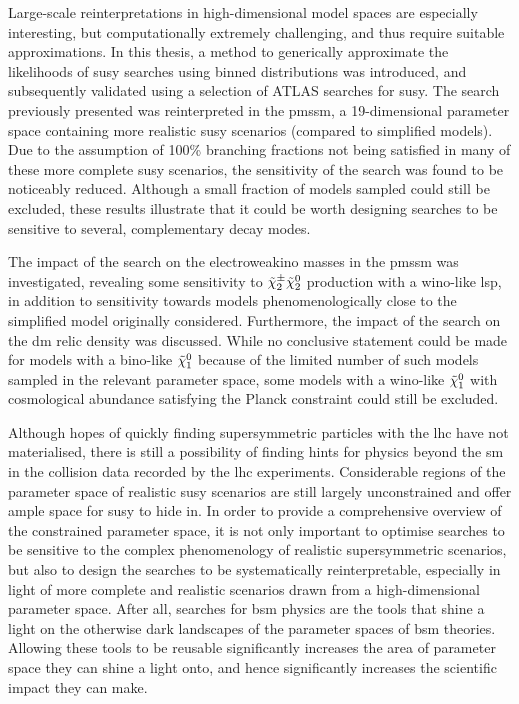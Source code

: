 Large-scale reinterpretations in high-dimensional model spaces are especially interesting, but computationally extremely challenging, and thus require suitable approximations. In this thesis, a method to generically approximate the likelihoods of \gls{susy} searches using binned distributions was introduced, and subsequently validated using a selection of ATLAS searches for \gls{susy}.
The search previously presented was reinterpreted in the \gls{pmssm}, a 19-dimensional parameter space containing more realistic \gls{susy} scenarios (compared to simplified models). Due to the assumption of 100\% branching fractions not being satisfied in many of these more complete \gls{susy} scenarios, the sensitivity of the \onelepton search was found to be noticeably reduced. Although a small fraction of models sampled could still be excluded, these results illustrate that it could be worth designing searches to be sensitive to several, complementary decay modes.

The impact of the \onelepton search on the electroweakino masses in the \gls{pmssm} was investigated, revealing some sensitivity to $\tilde{\chi}_2^\pm\tilde{\chi}_2^0$ production with a wino-like \gls{lsp}, in addition to sensitivity towards models phenomenologically close to the simplified model originally considered. Furthermore, the impact of the \onelepton search on the \gls{dm} relic density was discussed.
While no conclusive statement could be made for models with a bino-like $\tilde{\chi}_1^0$ because of the limited number of such models sampled in the relevant parameter space, some models with a wino-like $\tilde{\chi}_1^0$ with cosmological abundance satisfying the Planck constraint could still be excluded. 
 
 Although hopes of quickly finding supersymmetric particles with the \gls{lhc} have not materialised, there is still a possibility of finding hints for physics beyond the \gls{sm} in the collision data recorded by the \gls{lhc} experiments.
 Considerable regions of the parameter space of realistic \gls{susy} scenarios are still largely unconstrained and offer ample space for \gls{susy} to hide in.
 In order to provide a comprehensive overview of the constrained parameter space, it is not only important to optimise searches to be sensitive to the complex phenomenology of realistic supersymmetric scenarios, but also to design the searches to be systematically reinterpretable, especially in light of more complete and realistic scenarios drawn from a high-dimensional parameter space.
 After all, searches for \gls{bsm} physics are the tools that shine a light on the otherwise dark landscapes of the parameter spaces of \gls{bsm} theories.
 Allowing these tools to be reusable significantly increases the area of parameter space they can shine a light onto, and hence significantly increases the scientific impact they can make.
 
